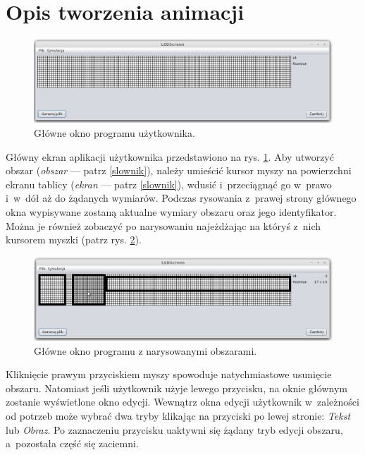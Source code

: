 \section{Opis tworzenia animacji}

\begin{figure}[htb]
	\begin{center}
		\includegraphics[width=\textwidth]{figures/gui.png}
	\end{center}
	\caption{Główne okno programu użytkownika.}
	\label{mainWindow}
\end{figure}

Główny ekran aplikacji użytkownika przedstawiono na rys. \ref{mainWindow}.  Aby utworzyć obszar (\textit{obszar} --- patrz \ref{slownik}), należy umieścić kursor myszy na powierzchni ekranu tablicy (\textit{ekran} --- patrz \ref{slownik}), wdusić i~przeciągnąć go w~prawo i~w~dół aż do żądanych wymiarów. Podczas rysowania z~prawej strony głównego okna wypisywane zostaną aktualne wymiary obszaru oraz jego identyfikator. Można je również zobaczyć po narysowaniu najeżdżając na któryś z~nich kursorem myszki (patrz rys. \ref{ani-gui2}).

\begin{figure}[htb]
	\begin{center}
		\includegraphics[width=\textwidth]{figures/gui2.png}
	\end{center}
	\caption{Główne okno programu z narysowanymi obszarami.}
	\label{ani-gui2}
\end{figure}

Kliknięcie prawym przyciskiem myszy spowoduje natychmiastowe usunięcie obszaru. Natomiast jeśli użytkownik użyje lewego przycisku, na oknie głównym zostanie wyświetlone okno edycji. Wewnątrz okna edycji użytkownik w~zależności od potrzeb może wybrać dwa tryby klikając na przyciski po lewej stronie: \textit{Tekst} lub \textit{Obraz}. Po zaznaczeniu przycisku uaktywni się żądany tryb edycji obszaru, a~pozostała część się zaciemni.

